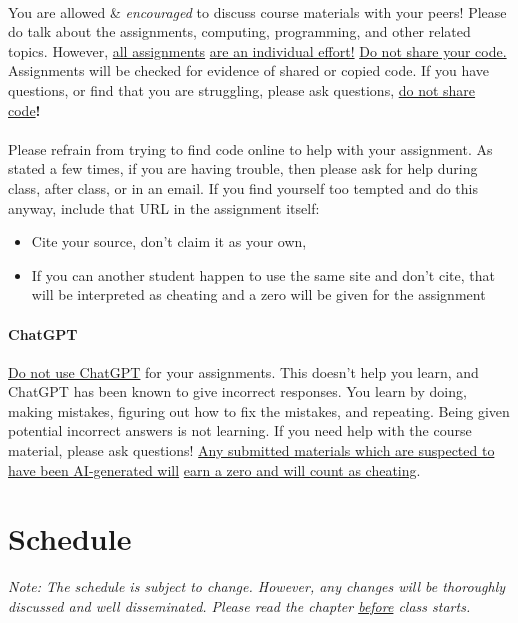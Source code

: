 \documentclass[letter,10pt]{article}
\begin{document}
\paragraph{}You are allowed \& \textit{encouraged} to discuss course materials with your peers! Please do talk about the assignments, computing, programming, and other related topics. However, \underline{all assignments} \underline{are an individual effort!} \underline{Do not share your code.} Assignments will be checked for evidence of shared or copied code. If you have questions, or find that you are struggling, please ask questions, \underline{do not share code}\textbf{!}

\paragraph{}Please refrain from trying to find code online to help with your assignment. As stated a few times, if you are having trouble, then please ask for help during class, after class, or in an email. If you find yourself too tempted and do this anyway, include that URL in the assignment itself:
\begin{itemize}
\item Cite your source, don't claim it as your own,
\item If you can another student happen to use the same site and don't cite, that will be interpreted as cheating and a zero will be given for the assignment
\end{itemize}

\paragraph{ChatGPT} \underline{Do not use ChatGPT} for your assignments. This doesn't help you learn, and ChatGPT has been known to give incorrect responses. You learn by doing, making mistakes, figuring out how to fix the mistakes, and repeating. Being given potential incorrect answers is not learning. If you need help with the course material, please ask questions! \underline{Any submitted materials which are suspected to have been AI-generated will} \underline{earn a zero and will count as cheating}.

\section*{Schedule}\label{sec:schedule}
\textit{Note: The schedule is subject to change. However, any changes will be thoroughly discussed and well disseminated. Please read the chapter \underline{before} class starts.}
\end{document}
